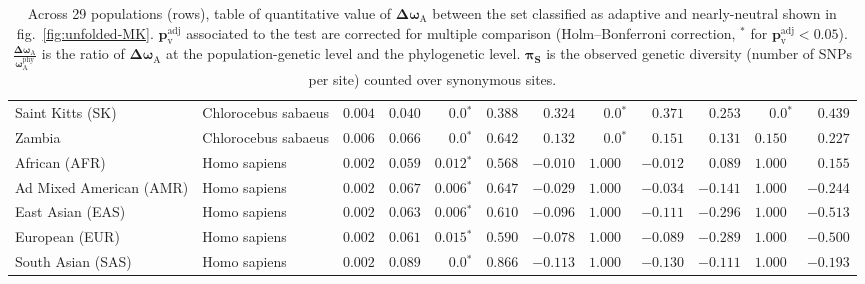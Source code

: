 \documentclass[9pt,twocolumn,twoside,lineno]{pnas-new}
\newcommand{\rateApop}{\omega_{\mathrm{A}}}
\newcommand{\rateAphy}{\rateApop^{\mathrm{phy}}}
\begin{document}
\begin{table*}[tb]
\begin{adjustbox}{width=17.8cm}
\begin{tabular}{||l|l|r||r|r|r||r|r|r||r|r|r||}
              \rowcolor{LIGHTGREY} Saint Kitts (SK)               & Chlorocebus sabaeus & $ 0.004$ & $ 0.040$ & $\bm{0.0{^*}}$                  & $ 0.388$                                                                     & $ 0.324$ & $\bm{0.0{^*}}$ & $ 0.371$ & $ 0.253$ & $\bm{0.0{^*}}$ & $ 0.439$ \\
              \rowcolor{LIGHTGREY} Zambia                         & Chlorocebus sabaeus & $ 0.006$ & $ 0.066$ & $\bm{0.0{^*}}$                  & $ 0.642$                                                                     & $ 0.132$                      & $\bm{0.0{^*}}$ & $ 0.151$ & $ 0.131$ & $ 0.150~~$ & $ 0.227$ \\
              African (AFR)                                       & Homo sapiens        & $ 0.002$ & $ 0.059$ & $\bm{ 0.012{^*}}$ & $ 0.568$ & $-0.010$ & $ 1.000~~$ & $-0.012$ & $ 0.089$ & $ 1.000~~$ & $ 0.155$ \\
              Ad Mixed American (AMR)                             & Homo sapiens        & $ 0.002$ & $ 0.067$ & $\bm{ 0.006{^*}}$ & $ 0.647$ & $-0.029$ & $ 1.000~~$ & $-0.034$ & $-0.141$ & $ 1.000~~$ & $-0.244$ \\
              East Asian (EAS)                                    & Homo sapiens        & $ 0.002$ & $ 0.063$ & $\bm{ 0.006{^*}}$ & $ 0.610$ & $-0.096$ & $ 1.000~~$ & $-0.111$ & $-0.296$ & $ 1.000~~$ & $-0.513$ \\
              European (EUR)                                      & Homo sapiens        & $ 0.002$ & $ 0.061$ & $\bm{ 0.015{^*}}$ & $ 0.590$ & $-0.078$ & $ 1.000~~$ & $-0.089$ & $-0.289$ & $ 1.000~~$ & $-0.500$ \\
              South Asian (SAS)                                   & Homo sapiens        & $ 0.002$ & $ 0.089$ & $\bm{0.0{^*}}$    & $ 0.866$ & $-0.113$ & $ 1.000~~$ & $-0.130$ & $-0.111$ & $ 1.000~~$ & $-0.193$ \\
              \bottomrule
       \end{tabular}
       \end{adjustbox}
       \caption{
              Across 29 populations (rows), table of quantitative value of $\bm{\Delta \rateApop }$ between the set classified as adaptive and nearly-neutral shown in fig.~\ref{fig:unfolded-MK}.
              $\bm{p_{\mathrm{v}}^{\mathrm{adj}} }$ associated to the test are corrected for multiple comparison (Holm–Bonferroni correction, $\bm{^*}$ for $\bm{p_{\mathrm{v}}^{\mathrm{adj}} < 0.05}$).
              $\bm{\frac{\Delta\rateApop}{\rateAphy}}$ is the ratio of $\bm{\Delta \rateApop}$ at the population-genetic level and the phylogenetic level.
              $\bm{\pi_{\textrm{S}}}$ is the observed genetic diversity (number of SNPs per site) counted over synonymous sites.
       }
       \label{table:unfolded-MK}
\end{table*}
\end{document}
